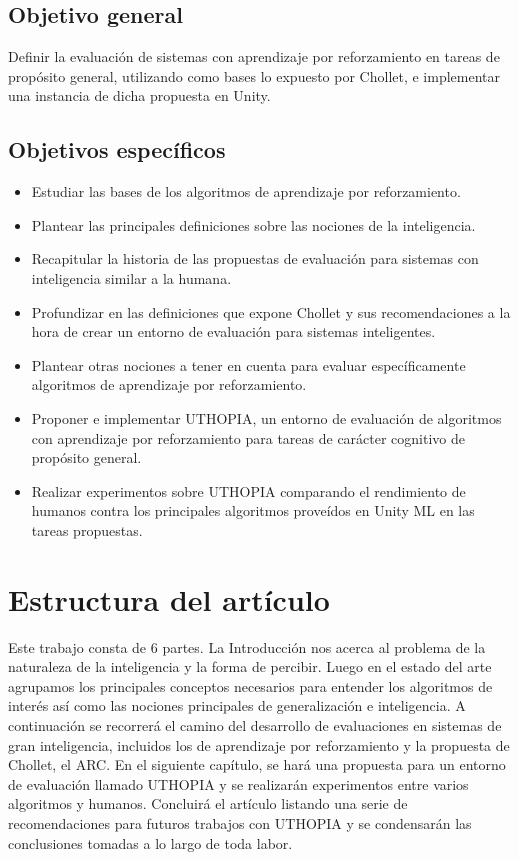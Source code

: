 \subsection*{Objetivo general}
Definir la evaluación de sistemas con aprendizaje por reforzamiento en tareas de propósito general, utilizando como bases lo expuesto por Chollet, e implementar una instancia de dicha propuesta en Unity.

\subsection*{Objetivos específicos}
\begin{itemize}
    \item Estudiar las bases de los algoritmos de aprendizaje por reforzamiento.
    \item Plantear las principales definiciones sobre las nociones de la inteligencia.
    \item Recapitular la historia de las propuestas de evaluación para sistemas con inteligencia similar a la humana.
    \item Profundizar en las definiciones que expone Chollet y sus recomendaciones a la hora de crear un entorno de evaluación para sistemas inteligentes.
    \item Plantear otras nociones a tener en cuenta para evaluar específicamente algoritmos de aprendizaje por reforzamiento.
    \item Proponer e implementar UTHOPIA, un entorno de evaluación de algoritmos con aprendizaje por reforzamiento para tareas de carácter cognitivo de propósito general.
    \item Realizar experimentos sobre UTHOPIA comparando el rendimiento de humanos contra los principales algoritmos proveídos en Unity ML en las tareas propuestas.
\end{itemize}

\section*{Estructura del artículo}
Este trabajo consta de 6 partes. La Introducción nos acerca al problema de la naturaleza de la inteligencia y la forma de percibir. Luego en el estado del arte agrupamos los principales conceptos necesarios para entender los algoritmos de interés así como las nociones principales de generalización e inteligencia. A continuación se recorrerá el camino del desarrollo de evaluaciones en sistemas de gran inteligencia, incluidos los de aprendizaje por reforzamiento y la propuesta de Chollet, el ARC. En el siguiente capítulo, se hará una propuesta para un entorno de evaluación llamado UTHOPIA y se realizarán experimentos entre varios algoritmos y humanos. Concluirá el artículo listando una serie de recomendaciones para futuros trabajos con UTHOPIA y se condensarán las conclusiones tomadas a lo largo de toda labor. 


